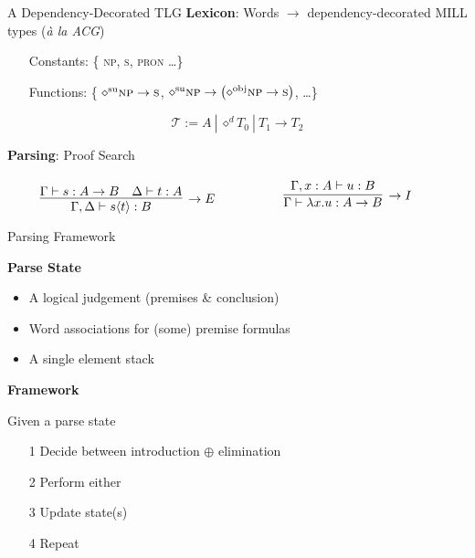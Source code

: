 \documentclass{beamer}
\begin{document}
\begin{frame}{A Dependency-Decorated TLG}
\textbf{Lexicon}: Words $\rightarrow$ dependency-decorated MILL types \small{(\textit{\`{a} la ACG})}
\begin{itemize}
	\item[] Constants: \{ \textsc{np}, \textsc{s}, \textsc{pron} \dots \}
	\item[] Functions: \{ $\diamond^\text{su}\textsc{np}\rightarrow\textsc{s}$, $\diamond^\text{su}\textsc{np}\rightarrow\left(\diamond^\text{obj}\textsc{np}\rightarrow\textsc{s} \right)$, \dots \}
\end{itemize}


\[
\mathcal{T} := A \ | \ \diamond^d T_0 \ | \ T_1 \to T_2
\]
\vfill 

\pause 
\textbf{Parsing}: Proof Search
    \begin{align*}
    \begin{minipage}{0.5\textwidth}
		\[
	        \infer[\rightarrow E]{\Gamma, \Delta \vdash s\langle t \rangle: B}{
	            \Gamma \vdash s: A \rightarrow B
	            &
	            \Delta \vdash t: A
	        }
	    \]
	    \end{minipage}%
	    \begin{minipage}{0.5\textwidth}
	    \[
	        \infer[\rightarrow I]{\Gamma \vdash \lambda x.u : A \rightarrow B}{
	            \Gamma, x: A \vdash u: B
	        }
	    \]
    	\end{minipage}
    \end{align*}
\end{frame}

\begin{frame}{Parsing Framework}	
	
	\textbf{\alert{Parse State}}
	\begin{itemize}
		\item A logical judgement (premises \& conclusion)
		\item Word associations for (some) premise formulas
		\item A single element stack
	\end{itemize}
	
	\pause
	\textbf{\alert{Framework}}
	
	Given a parse state
	\begin{itemize}
		\item[1] Decide between introduction $\oplus$ elimination
		\item[2] Perform either
		\item[3] Update state(s) 
		\item[4] Repeat
	\end{itemize}		
\end{frame}
\end{document}
